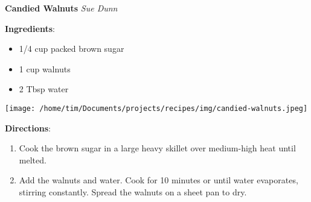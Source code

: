 \documentclass[11pt, twoside, openany]{book}
\begin{document}
\noindent\begin{minipage}[t]{\linewidth}%
{\Large\textbf{Candied Walnuts}} \label{candied-walnuts}\hfill\textit{Sue Dunn}\\
\noindent\begin{minipage}[t]{0.78\linewidth}%
\textbf{Ingredients}:\vspace{-3mm}
\begin{multicols}{2}
\begin{itemize}\setlength\itemsep{-1mm}
\item 1/4 cup packed brown sugar
\item 1 cup walnuts
\item 2 Tbsp water
\end{itemize}
\end{multicols}
\end{minipage}
\noindent\begin{minipage}[t]{0.18\linewidth}
\centering \strut\vspace*{-\baselineskip}\newline
\texttt{[image: /home/tim/Documents/projects/recipes/img/candied-walnuts.jpeg]}\\
\end{minipage}\vspace{3mm}
\textbf{Directions}:
\vspace{-3mm}\begin{enumerate}\setlength\itemsep{-1mm}
\item Cook the brown sugar in a large heavy skillet over medium-high heat until melted.
\item Add the walnuts and water. Cook for 10 minutes or until water evaporates, stirring constantly. Spread the walnuts on a sheet pan to dry.
\end{enumerate}
\end{minipage}\vspace{8mm}
\end{document}
